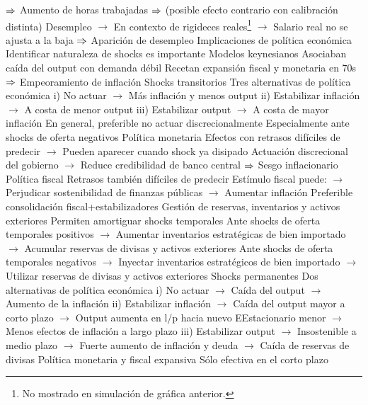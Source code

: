 \documentclass{nuevotema}
\begin{document}
\begin{esquemal}
				\4[] $\Rightarrow$ Aumento de horas trabajadas
				\4[] $\Rightarrow$ (posible efecto contrario con calibración distinta)
				\4[] Desempleo
				\4[] $\to$ En contexto de rigideces reales\footnote{No mostrado en simulación de gráfica anterior.}
				\4[] $\to$ Salario real no se ajusta a la baja
				\4[] $\Rightarrow$ Aparición de desempleo
		\2 Implicaciones de política económica
			\3 Identificar naturaleza de shocks es importante
				\4 Modelos keynesianos
				\4[] Asociaban caída del output con demanda débil
				\4[] Recetan expansión fiscal y monetaria en 70s
				\4[] $\Rightarrow$ Empeoramiento de inflación
			\3 Shocks transitorios
				\4 Tres alternativas de política económica
				\4[] i) No actuar
				\4[] $\to$ Más inflación y menos output
				\4[] ii) Estabilizar inflación
				\4[] $\to$ A costa de menor output
				\4[] iii) Estabilizar output
				\4[] $\to$ A costa de mayor inflación
				\4 En general, preferible no actuar discrecionalmente
				\4[] Especialmente ante shocks de oferta negativos
				\4 Política monetaria
				\4[] Efectos con retrasos difíciles de predecir
				\4[] $\to$ Pueden aparecer cuando shock ya disipado
				\4[] Actuación discrecional del gobierno
				\4[] $\to$ Reduce credibilidad de banco central
				\4[] $\Rightarrow$ Sesgo inflacionario
				\4 Política fiscal
				\4[] Retrasos también difíciles de predecir
				\4[] Estímulo fiscal puede:
				\4[] $\to$ Perjudicar sostenibilidad de finanzas públicas
				\4[] $\to$ Aumentar inflación
				\4[] Preferible consolidación fiscal+estabilizadores
				\4 Gestión de reservas, inventarios y activos exteriores
				\4[] Permiten amortiguar shocks temporales
				\4[] Ante shocks de oferta temporales positivos
				\4[] $\to$ Aumentar inventarios estratégicas de bien importado
				\4[] $\to$ Acumular reservas de divisas y activos exteriores
				\4[] Ante shocks de oferta temporales negativos
				\4[] $\to$ Inyectar inventarios estratégicos de bien importado
				\4[] $\to$ Utilizar reservas de divisas y activos exteriores
			\3 Shocks permanentes
				\4 Dos alternativas de política económica
				\4[] i) No actuar
				\4[] $\to$ Caída del output
				\4[] $\to$ Aumento de la inflación
				\4[] ii) Estabilizar inflación
				\4[] $\to$ Caída del output mayor a corto plazo
				\4[] $\to$ Output aumenta en l/p hacia nuevo EEstacionario menor
				\4[] $\to$ Menos efectos de inflación a largo plazo
				\4[] iii) Estabilizar output
				\4[] $\to$ Insostenible a medio plazo
				\4[] $\to$ Fuerte aumento de inflación y deuda
				\4[] $\to$ Caída de reservas de divisas
				\4 Política monetaria y fiscal expansiva
				\4[] Sólo efectiva en el corto plazo

\end{esquemal}
\end{document}
